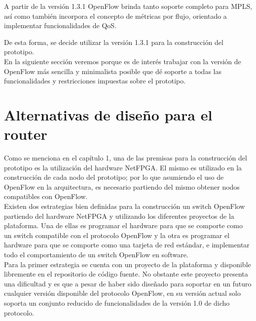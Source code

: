 A partir de la versión 1.3.1 OpenFlow brinda tanto soporte completo para MPLS, así como también incorpora el concepto de métricas por flujo, orientado a implementar funcionalidades de QoS. 

De esta forma, se decide utilizar la versión 1.3.1 para la construcción del prototipo.\\



En la siguiente secci\'on veremos porque es de inter\'es trabajar con la versi\'on de OpenFlow m\'as sencilla y minimalista posible que d\'e soporte a todas las funcionalidades y restricciones impuestas sobre el prototipo.\\ 

\section[Alternativas de dise\~no para el router]{Alternativas de dise\~no para el router}

Como se menciona en el cap\'itulo 1, una de las premisas para la construcción del prototipo es la utilizaci\'on del hardware NetFPGA. El mismo es utilizado en la construcción de cada nodo del prototipo; por lo que asumiendo el uso de OpenFlow en la arquitectura, es necesario partiendo del mismo obtener nodos compatibles con OpenFlow.\\ 

Existen dos estrategias bien definidas para la construcci\'on un switch OpenFlow partiendo del hardware NetFPGA y utilizando los diferentes proyectos de la plataforma. Una de ellas es programar el hardware para que se comporte como un switch compatible con el protocolo OpenFlow y la otra es programar el hardware para que se comporte como una tarjeta de red estándar, e implementar todo el comportamiento de un switch OpenFlow en software.\\

Para la primer estrategia se cuenta con un proyecto de la plataforma y disponible libremente en el repositorio de c\'odigo fuente. No obstante este proyecto presenta una dificultad y es que a pesar de haber sido dise\~nado para soportar en un futuro cualquier versi\'on disponible del protocolo OpenFlow, en su versi\'on actual solo soporta un conjunto reducido de funcionalidades de la versi\'on 1.0 de dicho protocolo. 

